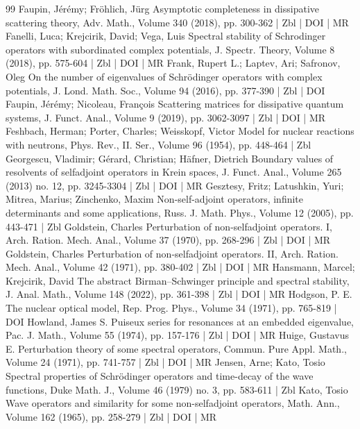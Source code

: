 \documentclass[10pt]{amsart}
\theoremstyle{definition}\newtheorem{defi}[theo]{Definition}\newtheorem{rema}[theo]{Remark}\newtheorem{exam}[theo]{Example}\newtheorem{exem}[theo]{Example}\newtheorem{nota}[theo]{Notation}
\begin{document}
\begin{thebibliography}{99}
Faupin, Jérémy; Fröhlich, Jürg Asymptotic completeness in dissipative scattering theory, Adv. Math., Volume 340 (2018), pp. 300-362 | Zbl | DOI | MR
Fanelli, Luca; Krejcirik, David; Vega, Luis Spectral stability of Schrodinger operators with subordinated complex potentials, J. Spectr. Theory, Volume 8 (2018), pp. 575-604 | Zbl | DOI | MR
Frank, Rupert L.; Laptev, Ari; Safronov, Oleg On the number of eigenvalues of Schrödinger operators with complex potentials, J. Lond. Math. Soc., Volume 94 (2016), pp. 377-390 | Zbl | DOI
Faupin, Jérémy; Nicoleau, François Scattering matrices for dissipative quantum systems, J. Funct. Anal., Volume 9 (2019), pp. 3062-3097 | Zbl | DOI | MR
Feshbach, Herman; Porter, Charles; Weisskopf, Victor Model for nuclear reactions with neutrons, Phys. Rev., II. Ser., Volume 96 (1954), pp. 448-464 | Zbl
Georgescu, Vladimir; Gérard, Christian; Häfner, Dietrich Boundary values of resolvents of selfadjoint operators in Krein spaces, J. Funct. Anal., Volume 265 (2013) no. 12, pp. 3245-3304 | Zbl | DOI | MR
Gesztesy, Fritz; Latushkin, Yuri; Mitrea, Marius; Zinchenko, Maxim Non-self-adjoint operators, infinite determinants and some applications, Russ. J. Math. Phys., Volume 12 (2005), pp. 443-471 | Zbl
Goldstein, Charles Perturbation of non-selfadjoint operators. I, Arch. Ration. Mech. Anal., Volume 37 (1970), pp. 268-296 | Zbl | DOI | MR
Goldstein, Charles Perturbation of non-selfadjoint operators. II, Arch. Ration. Mech. Anal., Volume 42 (1971), pp. 380-402 | Zbl | DOI | MR
Hansmann, Marcel; Krejcirik, David The abstract Birman–Schwinger principle and spectral stability, J. Anal. Math., Volume 148 (2022), pp. 361-398 | Zbl | DOI | MR
Hodgson, P. E. The nuclear optical model, Rep. Prog. Phys., Volume 34 (1971), pp. 765-819 | DOI
Howland, James S. Puiseux series for resonances at an embedded eigenvalue, Pac. J. Math., Volume 55 (1974), pp. 157-176 | Zbl | DOI | MR
Huige, Gustavus E. Perturbation theory of some spectral operators, Commun. Pure Appl. Math., Volume 24 (1971), pp. 741-757 | Zbl | DOI | MR
Jensen, Arne; Kato, Tosio Spectral properties of Schrödinger operators and time-decay of the wave functions, Duke Math. J., Volume 46 (1979) no. 3, pp. 583-611 | Zbl
Kato, Tosio Wave operators and similarity for some non-selfadjoint operators, Math. Ann., Volume 162 (1965), pp. 258-279 | Zbl | DOI | MR

\end{thebibliography}
\end{document}
